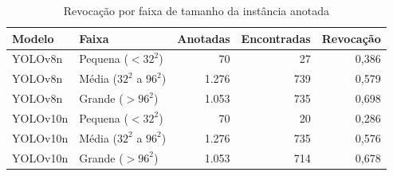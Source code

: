 \begin{table}[H]
\centering
\small
\caption{Revocação por faixa de tamanho da instância anotada}
\label{tab:tamanho}
\begin{tabular}{llrrr}
\toprule
\textbf{Modelo} & \textbf{Faixa} & \textbf{Anotadas} &
\textbf{Encontradas} & \textbf{Revocação} \\
\midrule
YOLOv8n & Pequena ($<32^2$) & 70 & 27 & 0,386 \\
YOLOv8n & Média ($32^2$ a $96^2$) & 1.276 & 739 & 0,579 \\
YOLOv8n & Grande ($>96^2$) & 1.053 & 735 & 0,698 \\
\midrule
YOLOv10n & Pequena ($<32^2$) & 70 & 20 & 0,286 \\
YOLOv10n & Média ($32^2$ a $96^2$) & 1.276 & 735 & 0,576 \\
YOLOv10n & Grande ($>96^2$) & 1.053 & 714 & 0,678 \\
\bottomrule
\end{tabular}
\end{table}
